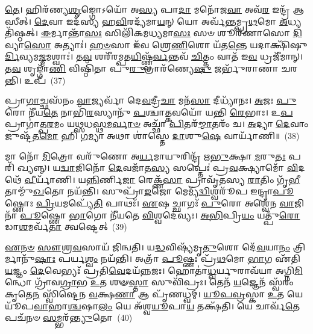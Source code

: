 \-\ul{𑌤𑍇}\-। 𑌹𑌿𑌰᳴𑌣𑍍𑌯\-\ul{𑌶𑍃}\-𑌙𑍍𑌗𑍋\-𑌽𑌯𑍋᳴ 𑌅\-\ul{𑌸𑍍𑌯} 𑌪𑌾\-\ul{𑌦𑌾} 𑌮𑌨𑍋᳴𑌜\-\ul{𑌵𑌾} 𑌅𑌵᳴\-\ul{𑌰} 𑌇𑌨𑍍𑌦𑍍𑌰᳴ 𑌆𑌸𑍀𑌤𑍍। \ul{𑌦𑍇}\-𑌵𑌾 𑌇𑌦᳴𑌸𑍍𑌯 𑌹\-\ul{𑌵𑌿}\-𑌰𑌦𑍍𑌯᳴𑌮𑌾\-\ul{𑌯}\-𑌨𑍍 𑌯𑍋 𑌅𑌰𑍍𑌵᳴𑌨𑍍𑌤𑌮𑍍𑌪𑍍𑌰\-\ul{𑌥}\-𑌮𑍋 \ul{𑌅}\-𑌧𑍍𑌯𑌤𑌿᳴𑌷𑍍𑌠𑌤𑍍। \ul{𑌈}\-𑌰𑍍𑌮𑌾𑌨𑍍𑌤𑌾᳴\-\ul{𑌸𑌃} 𑌸𑌿𑌲𑌿᳴𑌕𑌮𑌧𑍍𑌯𑌮𑌾\-\ul{𑌸𑌃} 𑌸𑍞 𑌶𑍂𑌰᳴𑌣𑌾𑌸𑍋 \ul{𑌦𑌿}\-𑌵𑍍𑌯𑌾\-\ul{𑌸𑍋} 𑌅𑌤𑍍𑌯𑌾𑌃॑। \ul{𑌹}\-\-\ul{𑍞}\-𑌸𑌾 𑌇᳴𑌵 𑌶𑍍𑌰𑍇\-\ul{𑌣𑌿}\-𑌶𑍋 𑌯᳴𑌤\-\ul{𑌨𑍍𑌤𑍇} 𑌯𑌦𑌾𑌕𑍍𑌷𑌿᳴𑌷𑍁\-\ul{𑌰𑍍𑌦𑌿}\-𑌵𑍍𑌯𑌮\-\ul{𑌜𑍍𑌮}\-𑌮𑌶𑍍𑌵𑌾𑌃॑। 𑌤\-\ul{𑌵} 𑌶𑌰𑍀᳴𑌰𑌮𑍍𑌪𑌤\-\ul{𑌯𑌿}\-𑌷𑍍𑌣𑍍𑌵᳴\-\ul{𑌰𑍍𑌵}\-𑌨𑍍𑌤𑌵᳴ \ul{𑌚𑌿}\-𑌤𑍍𑌤𑌂 𑌵𑌾𑌤᳴ 𑌇\-\ul{𑌵} 𑌧𑍍𑌰𑌜𑍀᳴𑌮𑌾𑌨𑍍। 𑌤\-\ul{𑌵} 𑌶𑍃𑌙𑍍𑌗𑌾᳴\-\ul{𑌣𑌿} 𑌵𑌿𑌷𑍍𑌠𑌿᳴𑌤𑌾 𑌪𑍁\-\ul{𑌰𑍁}\-𑌤𑍍𑌰𑌾𑌰᳴𑌣𑍍𑌯𑍇\-\ul{𑌷𑍁} 𑌜𑌰𑍍𑌭𑍁᳴𑌰𑌾𑌣𑌾 𑌚𑌰𑌨𑍍𑌤𑌿। 𑌉𑌪᳴~(37)

𑌪𑍍𑌰𑌾\-\ul{𑌗𑌾}\-𑌚𑍍𑌛𑌸᳴𑌨𑌂 \ul{𑌵𑌾}\-𑌜𑍍𑌯𑌰𑍍𑌵𑌾᳴ 𑌦𑍇\-\ul{𑌵}\-𑌦𑍍𑌰𑍀\-\ul{𑌚𑌾} 𑌮𑌨᳴\-\ul{𑌸𑌾} 𑌦𑍀𑌧𑍍𑌯𑌾᳴𑌨𑌃। \ul{𑌅}\-𑌜𑌃 \ul{𑌪𑍁}\-𑌰𑍋 𑌨𑍀᳴𑌯\-\ul{𑌤𑍇} 𑌨𑌾𑌭𑌿᳴\-\ul{𑌰}\-𑌸𑍍𑌯𑌾𑌨𑍁᳴ \ul{𑌪}\-𑌶𑍍𑌚𑌾\-\ul{𑌤𑍍𑌕}\-𑌵𑌯𑍋᳴ 𑌯𑌨𑍍𑌤𑌿 \ul{𑌰𑍇}\-𑌭𑌾𑌃। 𑌉\-\ul{𑌪} 𑌪𑍍𑌰𑌾𑌗𑌾॑𑌤𑍍𑌪\-\ul{𑌰}\-𑌮𑌂 𑌯\-\ul{𑌥𑍍𑌸}\-𑌧\-\ul{𑌸𑍍𑌥}\-𑌮\-\ul{𑌰𑍍𑌵𑌾}\-\-\ul{𑍞} 𑌅𑌚𑍍𑌛𑌾᳴ \ul{𑌪𑌿}\-𑌤𑌰᳴\-\ul{𑌮𑍍𑌮𑌾}\-𑌤𑌰𑌂᳴ 𑌚। \ul{𑌅}\-𑌦𑍍𑌯𑌾 \ul{𑌦𑍇}\-𑌵𑌾𑌂 𑌜𑍁𑌷𑍍𑌟᳴𑌤\-\ul{𑌮𑍋} 𑌹𑌿 \ul{𑌗}\-𑌮𑍍𑌯𑌾 𑌅𑌥𑌾 𑌶𑌾॑𑌸𑍍𑌤𑍇 \ul{𑌦𑌾}\-𑌶𑍁\-\ul{𑌷𑍇} 𑌵𑌾𑌰𑍍𑌯𑌾᳴𑌣𑌿॥~(38)

{\anuvakamend[{𑌵𑌿𑌪𑍃᳴𑌕𑍍𑌤𑍋 \ul{𑌦𑌿}\-𑌵𑌾 \ul{𑌵𑍀}\-𑌰𑍍𑌯᳴𑌮𑍁𑌪𑍈\-\ul{𑌕𑌾}\-𑌨𑍍𑌨𑌚᳴𑌤𑍍𑌵𑌾\-\ul{𑌰𑌿}\-\-\ul{𑍞}\-𑌶𑌚𑍍𑌚᳴}]}%

𑌮𑌾 𑌨𑍋᳴ \ul{𑌮𑌿}\-𑌤𑍍𑌰𑍋 𑌵𑌰𑍁᳴𑌣𑍋 𑌅\-\ul{𑌰𑍍𑌯}\-𑌮𑌾𑌯𑍁𑌰𑌿𑌨𑍍𑌦𑍍𑌰᳴ 𑌋\-\ul{𑌭𑍁}\-𑌕𑍍𑌷𑌾 \ul{𑌮}\-𑌰𑍁\-\ul{𑌤𑌃} 𑌪𑌰𑌿᳴ 𑌖𑍍𑌯𑌨𑍍𑌨𑍍। 𑌯\-\ul{𑌦𑍍𑌵𑌾}\-𑌜𑌿𑌨𑍋᳴ \ul{𑌦𑍇}\-𑌵𑌜𑌾᳴𑌤\-\ul{𑌸𑍍𑌯} 𑌸𑌪𑍍𑌤𑍇𑌃॑ 𑌪𑍍𑌰\-\ul{𑌵}\-𑌕𑍍𑌷𑍍𑌯𑌾𑌮𑍋᳴ \ul{𑌵𑌿}\-𑌦𑌥𑍇᳴ \ul{𑌵𑍀}\-𑌰𑍍𑌯𑌾᳴𑌣𑌿। 𑌯\-\ul{𑌨𑍍𑌨𑌿}\-𑌰𑍍𑌣𑌿\-\ul{𑌜𑌾} 𑌰𑍇𑌕𑍍𑌣᳴\-\ul{𑌸𑌾} 𑌪𑍍𑌰𑌾𑌵𑍃᳴𑌤𑌸𑍍𑌯 \ul{𑌰𑌾}\-𑌤𑌿𑌂 𑌗𑍃᳴\-\ul{𑌭𑍀}\-𑌤𑌾𑌮𑍍𑌮𑍁᳴\-\ul{𑌖}\-𑌤𑍋 𑌨𑌯᳴𑌨𑍍𑌤𑌿। 𑌸𑍁𑌪𑍍𑌰𑌾᳴\-\ul{𑌙}\-𑌜𑍋 𑌮𑍇𑌮𑍍𑌯᳴\-\ul{𑌦𑍍𑌵𑌿}\-𑌶𑍍𑌵𑌰𑍂᳴𑌪 𑌇𑌨𑍍𑌦𑍍𑌰𑌾\-\ul{𑌪𑍂}\-𑌷𑍍𑌣𑍋𑌃 \ul{𑌪𑍍𑌰𑌿}\-𑌯𑌮𑌪𑍍𑌯𑍇᳴\-\ul{𑌤𑌿} 𑌪𑌾𑌥𑌃᳴। \ul{𑌏}\-𑌷 𑌚𑍍𑌛𑌾𑌗𑌃᳴ \ul{𑌪𑍁}\-𑌰𑍋 𑌅𑌶𑍍𑌵𑍇᳴𑌨 \ul{𑌵𑌾}\-𑌜𑌿𑌨𑌾᳴ \ul{𑌪𑍂}\-𑌷𑍍𑌣𑍋 \ul{𑌭𑌾}\-𑌗𑍋 𑌨𑍀᳴𑌯𑌤𑍇 \ul{𑌵𑌿}\-𑌶𑍍𑌵𑌦𑍇॑𑌵𑍍𑌯𑌃। \ul{𑌅}\-\-\ul{𑌭𑌿}\-𑌪𑍍𑌰𑌿\-\ul{𑌯𑌂} 𑌯𑌤𑍍𑌪𑍁᳴\-\ul{𑌰𑍋}\-𑌡𑌾\-\ul{𑌶}\-𑌮𑌰𑍍𑌵᳴\-\ul{𑌤𑌾} 𑌤𑍍𑌵𑌷𑍍𑌟𑍇𑌤𑍍~(39)

\-\ul{𑌏}\-\-\ul{𑌨}\-\-\ul{𑍞} \ul{𑌸𑍗}\-\-\ul{𑌶𑍍𑌰}\-\-\ul{𑌵}\-𑌸𑌾𑌯᳴ 𑌜𑌿𑌨𑍍𑌵𑌤𑌿। 𑌯\-\ul{𑌦𑍍𑌧}\-𑌵𑌿𑌷𑍍𑌯᳴𑌮𑍃\-\ul{𑌤𑍁}\-𑌶𑍋 𑌦𑍇᳴\-\ul{𑌵}\-𑌯𑌾\-\ul{𑌨𑌂} 𑌤𑍍𑌰𑌿𑌰𑍍𑌮𑌾𑌨𑍁᳴\-\ul{𑌷𑌾𑌃} 𑌪𑌰𑍍𑌯\-\ul{𑌶𑍍𑌵𑌂} 𑌨𑌯᳴𑌨𑍍𑌤𑌿। 𑌅𑌤𑍍𑌰𑌾᳴ \ul{𑌪𑍂}\-𑌷𑍍𑌣𑌃 𑌪𑍍𑌰᳴\-\ul{𑌥}\-𑌮𑍋 \ul{𑌭𑌾}\-𑌗 𑌏᳴𑌤𑌿 \ul{𑌯}\-𑌜𑍍𑌞𑌂 \ul{𑌦𑍇}\-𑌵𑍇𑌭𑍍𑌯𑌃᳴ 𑌪𑍍𑌰𑌤𑌿\-\ul{𑌵𑍇}\-𑌦𑌯᳴\-\ul{𑌨𑍍𑌨}\-𑌜𑌃। 𑌹𑍋𑌤𑌾॑\-\ul{𑌧𑍍𑌵}\-𑌰𑍍𑌯𑍁𑌰𑌾𑌵᳴𑌯𑌾 𑌅𑌗𑍍𑌨𑌿\-\ul{𑌮𑌿}\-𑌨𑍍𑌧𑍋 𑌗𑍍𑌰𑌾᳴𑌵\-\ul{𑌗𑍍𑌰𑌾}\-𑌭 \ul{𑌉}\-𑌤 𑌶𑍟\-\ul{𑌸𑍍𑌤𑌾} 𑌸𑍁𑌵𑌿᳴𑌪𑍍𑌰𑌃। 𑌤𑍇𑌨᳴ \ul{𑌯}\-𑌜𑍍𑌞𑍇𑌨᳴ 𑌸𑍍𑌵᳴𑌰𑌂 𑌕𑍃𑌤𑍇\-\ul{𑌨} 𑌸𑍍𑌵𑌿᳴𑌷𑍍𑌟𑍇𑌨 \ul{𑌵}\-𑌕𑍍𑌷\-\ul{𑌣𑌾} 𑌆 𑌪𑍃᳴𑌣𑌧𑍍𑌵𑌮𑍍। \ul{𑌯𑍂}\-\-\ul{𑌪}\-\-\ul{𑌵𑍍𑌰}\-𑌸𑍍𑌕𑌾 \ul{𑌉}\-𑌤 𑌯𑍇 𑌯𑍂᳴𑌪\-\ul{𑌵𑌾}\-𑌹𑌾\-\ul{𑌶𑍍𑌚}\-𑌷𑌾\-\ul{𑌲𑌂} 𑌯𑍇 𑌅᳴𑌶𑍍𑌵\-\ul{𑌯𑍂}\-𑌪𑌾\-\ul{𑌯} 𑌤𑌕𑍍𑌷᳴𑌤𑌿। 𑌯𑍇 𑌚𑌾𑌰𑍍𑌵᳴\-\ul{𑌤𑍇} 𑌪𑌚᳴𑌨𑍞 \ul{𑌸}\-𑌮𑍍𑌭𑌰᳴\-\ul{𑌨𑍍𑌤𑍍𑌯𑍁}\-𑌤𑍋~(40)

